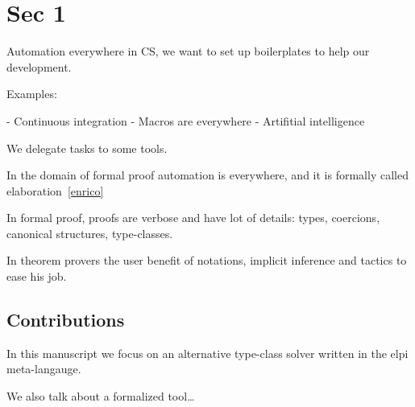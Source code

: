 \section{Sec 1}

Automation everywhere in CS, we want to set up boilerplates to help our
development.

Examples:

- Continuous integration
- Macros are everywhere
- Artifitial intelligence

We delegate tasks to some tools.

In the domain of formal proof automation is everywhere, and it is formally
called elaboration~\cref{enrico}

In formal proof, proofs are verbose and have lot of details: types, coercions,
canonical structures, type-classes. 

In theorem provers the user benefit of notations, implicit inference and
tactics to ease his job.


\subsection{Contributions}

In this manuscript we focus on an alternative type-class solver written
in the elpi meta-langauge.

We also talk about a formalized tool\dots
